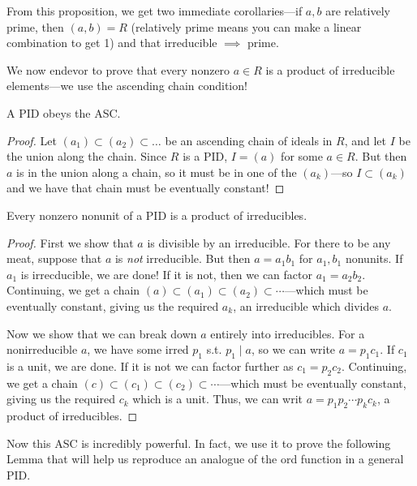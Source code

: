 From this proposition, we get two immediate corollaries---if \(a,b\) are
relatively prime, then \((a,b) = R\) (relatively prime means you can make a
linear combination to get 1) and that irreducible \(\implies \) prime.

We now endevor to prove that every nonzero \(a \in R\) is a product of
irreducible elements---we use the ascending chain condition!

\begin{lemma}
  A PID obeys the ASC.
\end{lemma}

\begin{proof}
  Let \((a_1) \subset(a_2) \subset \dots\) be an ascending chain of ideals in \(R\), and
  let \(I\) be the union along the chain. Since \(R\) is a PID, \(I = (a)\)
  for some \(a \in R\). But then \(a\) is in the union along a chain, so it must
  be in one of the \((a_k)\)---so \(I \subset(a_k)\) and we have that chain must
  be eventually constant!
\end{proof}

\begin{prop}
  Every nonzero nonunit of a PID is a product of irreducibles.
\end{prop}

\begin{proof}
  First we show that \(a\) is divisible by an irreducible. For there to be any
  meat, suppose that \(a\) is \emph{not} irreducible. But then \(a=a_1b_1\) for
  \(a_1,b_1\) nonunits. If \(a_1\) is irrecducible, we are done! If it is not,
  then we can factor \(a_1=a_2b_2\). Continuing, we get a chain
  \((a) \subset(a_1) \subset(a_2) \subset \cdots\)---which must be eventually
  constant, giving us the required \(a_k\), an irreducible which divides \(a\).

  Now we show that we can break down \(a\) entirely into irreducibles. For a
  nonirreducible \(a\), we have some irred \(p_1\) s.t. \(p_1\mid a\), so we can
  write \(a = p_1c_1\). If \(c_1\) is a unit, we are done. If it is not we can
  factor further as \(c_1=p_2c_2\). Continuing, we get a chain
  \((c) \subset(c_1) \subset(c_2) \subset \cdots\)---which must be eventually
  constant, giving us the required \(c_k\) which is a unit. Thus, we can writ
  \(a=p_1p_2\cdots p_kc_k\), a product of irreducibles.
\end{proof}

Now this ASC is incredibly powerful. In fact, we use it to prove the following
Lemma that will help us reproduce an analogue of the ord function in a general
PID.

